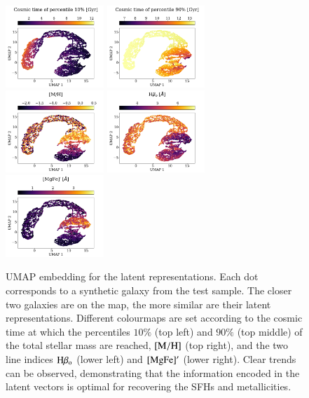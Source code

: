 \begin{figure}[h!]
    \centering
    
    \includegraphics[width=0.33\textwidth]{images/latents/UMAP_10.pdf}
    \includegraphics[width=0.33\textwidth]{images/latents/UMAP_90.pdf}
    \includegraphics[width=0.33\textwidth]{images/latents/UMAP_met.pdf}
    \includegraphics[width=0.33\textwidth]{images/latents/UMAP_hbeta.pdf}
     \includegraphics[width=0.33\textwidth]{images/latents/UMAP_mgfe.pdf}


     
    \caption{UMAP embedding for the latent representations. Each dot corresponds to a synthetic galaxy from the test sample. The closer two galaxies are on the map, the more similar are their latent representations. Different colourmaps are set according to the cosmic time at which the percentiles $10\%$ (top left) and $90\%$ (top middle) of the total stellar mass are reached, $[\rm{M/H}]$ (top right), and the two line indices  $\rm H{\beta_{o}}$ (lower left) and $[\rm{MgFe}]^{\prime}$ (lower right). Clear trends can be observed, demonstrating that the information encoded in the latent vectors is optimal for recovering the SFHs and metallicities.}
    \label{umap}
\end{figure}



